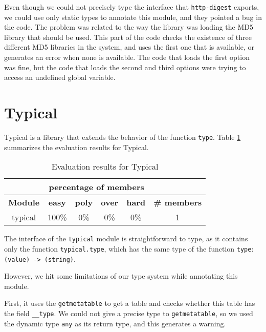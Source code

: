 Even though we could not precisely type the interface that \texttt{http-digest}
exports, we could use only static types to annotate this module,
and they pointed a bug in the code.
The problem was related to the way the library was loading the MD5 library
that should be used. 
This part of the code checks the existence of three different MD5 libraries
in the system, and uses the first one that is available, or generates an
error when none is available.
The code that loads the first option was fine, but the code that loads the
second and third options were trying to access an undefined global variable.

\section{Typical}

Typical is a library that extends the behavior of the function \texttt{type}. 
Table \ref{tab:evaltypical} summarizes the evaluation results for Typical.

\begin{table}[!ht]
\begin{center}
\begin{tabular}{|c|c|c|c|c|c|}
\cline{2-5}
\multicolumn{1}{c}{} & \multicolumn{4}{|c|}{percentage of members} & \multicolumn{1}{c}{} \\
\hline
\textbf{Module} & \textbf{easy} & \textbf{poly} & \textbf{over} & \textbf{hard} & \textbf{\# members} \\
\hline
typical & 100\% & 0\% & 0\% & 0\% & 1 \\ %
\hline
\end{tabular}
\end{center}
\caption{Evaluation results for Typical}
\label{tab:evaltypical}
\end{table}

The interface of the \texttt{typical} module is straightforward to type,
as it contains only the function \texttt{typical.type},
which has the same type of the function \texttt{type}: \texttt{(value) -> (string)}.

However, we hit some limitations of our type system while annotating this module.

First, it uses the \texttt{getmetatable} to get a table and
checks whether this table has the field \texttt{\string_\string_type}.
We could not give a precise type to \texttt{getmetatable}, so we used the dynamic
type \texttt{any} as its return type, and this generates a warning.

